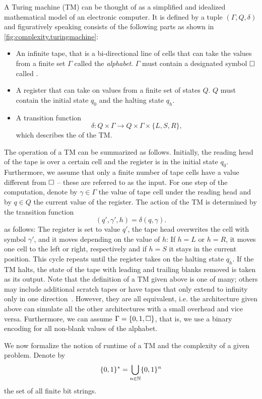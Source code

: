 A Turing machine (TM) can be thought of as a simplified and idealized mathematical model of an electronic computer.
It is defined by a tuple $(\Gamma, Q, \delta)$ and figuratively speaking consists of the following parts as shown in \cref{fig:complexity.turingmachine}:
\begin{itemize}
  \item An infinite tape, that is a bi-directional line of cells that can take the values from a finite set $\Gamma$ called the \emph{alphabet}.
    $\Gamma$ must contain a designated symbol $\square$ called .
  \item A register that can take on values from a finite set of states $Q$.
    $Q$ must contain the initial state $q_0$ and the halting state $q_h$.
  \item A transition function
    \[
      \delta\colon Q \times \Gamma \to Q \times \Gamma \times \{L, S, R\},
    \]
    which describes the  of the TM.
\end{itemize}
The operation of a TM can be summarized as follows.
Initially, the reading head of the tape is over a certain cell and the register is in the initial state $q_0$.
Furthermore, we assume that only a finite number of tape cells have a value different from $\square$ -- these are referred to as the input.
For one step of the computation, denote by $\gamma \in \Gamma$ the value of tape cell under the reading head and by $q \in Q$ the current value of the register.
The action of the TM is determined by the transition function
\[
  (q', \gamma', h) = \delta(q, \gamma).
\]
as follows:
The register is set to value $q'$, the tape head overwrites the cell with symbol $\gamma'$, and it moves depending on the value of $h$:
If $h = L$ or $h = R$, it moves one cell to the left or right, respectively and if $h = S$ it stays in the current position.
This cycle repeats until the register takes on the halting state $q_h$.
If the TM halts, the state of the tape with leading and trailing blanks removed is taken as its output.
Note that the definition of a TM given above is one of many; others may include additional scratch tapes or have tapes that only extend to infinity only in one direction~\cite{Arora_2009_Computational}.
However, they are all equivalent, i.e. the architecture given above can simulate all the other architectures with a small overhead and vice versa.
Furthermore, we can assume $\Gamma = \{0, 1, \square\}$, that is, we use a binary encoding for all non-blank values of the alphabet.

We now formalize the notion of runtime of a TM and the complexity of a given problem.
Denote by
\[
  \{0, 1\}^* = \bigcup_{n \in {\mathbb{N}}} \{0, 1\}^n
\]
the set of all finite bit strings.

